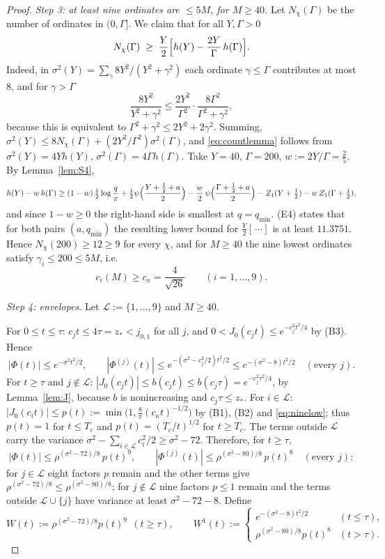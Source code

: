 \documentclass[11pt]{amsart}
\theoremstyle{definition}
\numberwithin{equation}{section}
\begin{document}
\begin{proof}
\emph{Step 3: at least nine ordinates are $\le5M$, for $M\ge40$.} Let
$N_\chi(\Gamma)$ be the number of ordinates in $(0,\Gamma]$. We claim
that for all $Y,\Gamma>0$
\begin{equation}\label{eq:countlemma}
N_\chi(\Gamma)\;\ge\;\frac Y2\Bigl[h(Y)-\frac{2Y}{\Gamma}\,h(\Gamma)\Bigr].
\end{equation}
Indeed, in $\sigma^2(Y)=\sum_\gamma8Y^2/(Y^2+\gamma^2)$ each ordinate
$\gamma\le\Gamma$ contributes at most $8$, and for $\gamma>\Gamma$
\[
\frac{8Y^2}{Y^2+\gamma^2}\le\frac{2Y^2}{\Gamma^2}\cdot
\frac{8\Gamma^2}{\Gamma^2+\gamma^2},
\]
because this is equivalent to $\Gamma^2+\gamma^2\le2Y^2+2\gamma^2$.
Summing, $\sigma^2(Y)\le8N_\chi(\Gamma)+(2Y^2/\Gamma^2)\sigma^2(\Gamma)$,
and \eqref{eq:countlemma} follows from $\sigma^2(Y)=4Yh(Y)$,
$\sigma^2(\Gamma)=4\Gamma h(\Gamma)$. Take $Y=40$, $\Gamma=200$,
$w:=2Y/\Gamma=\tfrac25$. By Lemma~\ref{lem:S4},
\[
h(Y)-w\,h(\Gamma)\ge(1-w)\,\tfrac12\log\frac q\pi
+\tfrac12\psi\Bigl(\frac{Y+\frac12+a}{2}\Bigr)
-\frac w2\,\psi\Bigl(\frac{\Gamma+\frac12+a}{2}\Bigr)
-Z_1(Y+\tfrac12)-w\,Z_1(\Gamma+\tfrac12),
\]
and since $1-w\ge0$ the right-hand side is smallest at $q=q_{\min}$.
(E4) states that for both pairs $(a,q_{\min})$ the resulting lower
bound for $\frac Y2[\,\cdots]$ is at least $11.3751$. Hence
$N_\chi(200)\ge12\ge9$ for every $\chi$, and for $M\ge40$ the nine
lowest ordinates satisfy $\gamma_i\le200\le5M$, i.e.
\begin{equation}\label{eq:ninelow}
c_i(M)\ge c_\kappa=\frac4{\sqrt{26}}\qquad(i=1,\dots,9).
\end{equation}

\emph{Step 4: envelopes.} Let $\mathcal L:=\{1,\dots,9\}$ and
$M\ge40$.

For $0\le t\le\tau$: $c_jt\le4\tau=z_*<j_{0,1}$ for all $j$, and
$0<J_0(c_jt)\le e^{-c_j^2t^2/4}$ by (B3). Hence
\[
|\Phi(t)|\le e^{-\sigma^2t^2/2},\qquad
|\Phi^{(j)}(t)|\le e^{-(\sigma^2-c_j^2/2)t^2/2}\le e^{-(\sigma^2-8)t^2/2}
\quad(\text{every }j).
\]
For $t\ge\tau$ and $j\notin\mathcal L$:
$|J_0(c_jt)|\le b(c_jt)\le b(c_j\tau)=e^{-c_j^2\tau^2/4}$, by
Lemma~\ref{lem:J}, because $b$ is nonincreasing and $c_j\tau\le z_*$.
For $i\in\mathcal L$: $|J_0(c_it)|\le p(t):=\min\bigl(1,\frac8\pi(c_\kappa t)^{-1/2}\bigr)$
by (B1), (B2) and \eqref{eq:ninelow}; thus $p(t)=1$ for $t\le T_c$ and
$p(t)=(T_c/t)^{1/2}$ for $t\ge T_c$. The terms outside $\mathcal L$
carry the variance $\sigma^2-\sum_{i\in\mathcal L}c_i^2/2\ge\sigma^2-72$.
Therefore, for $t\ge\tau$,
\[
|\Phi(t)|\le\rho^{(\sigma^2-72)/8}\,p(t)^9,\qquad
|\Phi^{(j)}(t)|\le\rho^{(\sigma^2-80)/8}\,p(t)^8\quad(\text{every }j):
\]
for $j\in\mathcal L$ eight factors $p$ remain and the other terms give
$\rho^{(\sigma^2-72)/8}\le\rho^{(\sigma^2-80)/8}$; for
$j\notin\mathcal L$ nine factors $p\le1$ remain and the terms outside
$\mathcal L\cup\{j\}$ have variance at least $\sigma^2-72-8$. Define
\[
W(t):=\rho^{(\sigma^2-72)/8}p(t)^9\ \ (t\ge\tau),\qquad
W^1(t):=\begin{cases}e^{-(\sigma^2-8)t^2/2}&(t\le\tau),\\
\rho^{(\sigma^2-80)/8}p(t)^8&(t>\tau).\end{cases}
\]


\end{proof}
\end{document}
